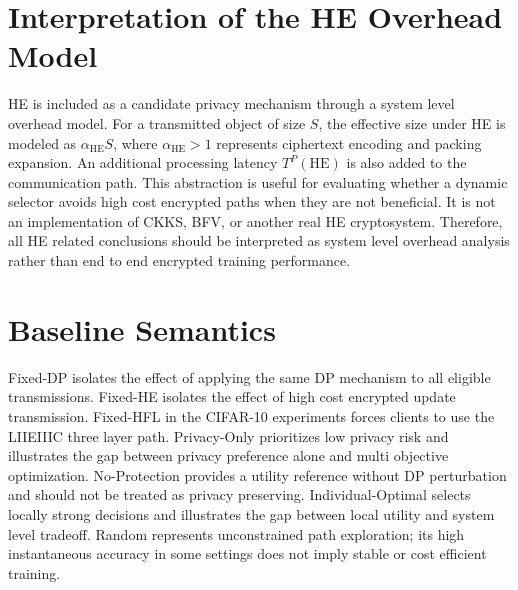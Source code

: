﻿\documentclass[preprint,12pt]{elsarticle}
\theoremstyle{plain}
\theoremstyle{definition}
\theoremstyle{remark}
\begin{document}
\appendix
\section{Interpretation of the HE Overhead Model}
\label{app:he_model}
HE is included as a candidate privacy mechanism through a system level overhead model.
For a transmitted object of size \(S\), the effective size under HE is modeled as \(\alpha_{\mathrm{HE}}S\), where \(\alpha_{\mathrm{HE}}>1\) represents ciphertext encoding and packing expansion.
An additional processing latency \(T^P(\mathrm{HE})\) is also added to the communication path.
This abstraction is useful for evaluating whether a dynamic selector avoids high cost encrypted paths when they are not beneficial.
It is not an implementation of CKKS, BFV, or another real HE cryptosystem.
Therefore, all HE related conclusions should be interpreted as system level overhead analysis rather than end to end encrypted training performance.

\section{Baseline Semantics}
\label{app:baselines}
Fixed-DP isolates the effect of applying the same DP mechanism to all eligible transmissions.
Fixed-HE isolates the effect of high cost encrypted update transmission.
Fixed-HFL in the CIFAR-10 experiments forces clients to use the LIIEIIIC three layer path.
Privacy-Only prioritizes low privacy risk and illustrates the gap between privacy preference alone and multi objective optimization.
No-Protection provides a utility reference without DP perturbation and should not be treated as privacy preserving.
Individual-Optimal selects locally strong decisions and illustrates the gap between local utility and system level tradeoff.
Random represents unconstrained path exploration; its high instantaneous accuracy in some settings does not imply stable or cost efficient training.


\end{document}
